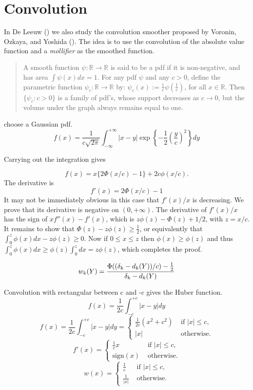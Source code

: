 \documentclass[
  12pt,
  letterpaper,
  DIV=11,
  numbers=noendperiod]{scrartcl}
\newcommand{\sectionbreak}{\pagebreak}
\begin{document}
\sectionbreak

\section{Convolution}\label{convolution}

In De Leeuw () we also study the
convolution smoother proposed by Voronin, Ozkaya, and Yoshida
(). The idea is to use the
convolution of the absolute value function and a \emph{mollifier} as the
smoothed function.

\begin{quote}
A smooth function \(\psi:\mathbb{R}\rightarrow\mathbb{R}\) is said to be
a pdf if it is non-negative, and has area \(\int\psi(x)dx=1\). For any
pdf \(\psi\) and any \(c>0\), deﬁne the parametric function
\(\psi_c:\mathbb{R}\rightarrow\mathbb{R}\) by:
\(\psi_c(x):= \frac{1}{c}\psi (\frac{1}{c})\), for all
\(x\in\mathbb{R}\). Then \(\{\psi_c:c>0\}\) is a family of pdf's, whose
support decreases as \(c\rightarrow 0\), but the volume under the graph
always remains equal to one.
\end{quote}

choose a Gaussian pdf. \[
f(x)=\frac{1}{c\sqrt{2\pi}}\int_{-\infty}^{+\infty}|x-y|\exp\left\{-\frac12(\frac{y}{c})^2\right\}dy
\]

Carrying out the integration gives

\[
f(x)=x\{2\Phi(x/c)-1\}+2c\phi(x/c).
\] The derivative is \[
f'(x)=2\Phi(x/c)-1
\] It may not be immediately obvious in this case that \(f'(x)/x\) is
decreasing. We prove that its derivative is negative on \((0,+\infty)\).
The derivative of \(f'(x)/x\) has the sign of \(xf''(x)-f'(x)\), which
is \(z\phi(z)-\Phi(z)+1/2\), with \(z=x/c\). It remains to show that
\(\Phi(z)-z\phi(z)\geq\frac12\), or equivalently that
\(\int_0^z\phi(x)dx-z\phi(z)\geq 0\). Now if \(0\leq x\leq z\) then
\(\phi(x)\geq\phi(z)\) and thus
\(\int_0^z\phi(x)dx\geq\phi(z)\int_0^zdx=z\phi(z)\), which completes the
proof.

\[
w_k(Y)=
\frac{\Phi((\delta_k-d_k(Y))/c)-\frac12}{\delta_k-d_k(Y)}\\
\]

Convolution with rectangular between c and -c gives the Huber function.
\[
f(x)=\frac{1}{2c}\int_{-c}^{+c}|x-y|dy
\] \[
f(x)=\frac{1}{2c}\int_{-c}^{+c}|x-y|dy=\begin{cases}
\frac{1}{2c}(x^2+c^2)&\text{ if }|x|\leq c,\\
|x|&\text{ otherwise}.
\end{cases}
\] \[
f'(x)=\begin{cases}
\frac{1}{c}x&\text{ if }|x|\leq c,\\
\text{sign}(x)&\text{ otherwise}.
\end{cases}
\] \[
w(x)=\begin{cases}
\frac{1}{c}&\text{ if }|x|\leq c,\\
\frac{1}{|x|}&\text{ otherwise}.
\end{cases}
\]
\end{document}
